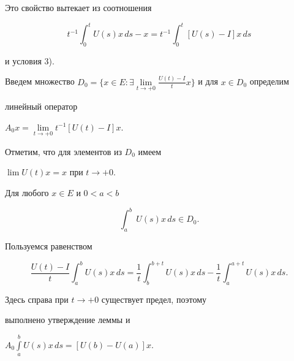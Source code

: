 Это свойство вытекает из соотношения


$$


t^{-1}\int^{t}_{0} U(s)x\,ds-x=


t^{-1}\int^{t}_{0} [U(s)-I] x\,ds


$$


и условия 3).





Введем множество $D_{0}=\{


x\in E:\exists\lim\limits_{t \to + 0}


\frac{U(t)-I}{t}x \}$ и для $x\in D_{0}$ определим


линейный оператор


$A_{0}x=\lim\limits_{t\to +0} t^{-1}[ U(t)-I] x$.





Отметим, что для элементов из $D_{0}$ имеем


$\lim U(t)x=x$ при $t\to + 0$.








\begin{lem}


Для любого $x\in E$ и $0<a< b$


$$


\int^{b}_{a} \ U(s) x\,ds \in D_{0}.


$$


\end{lem}








\begin{pf}


Пользуемся равенством


$$


\frac{U(t)-I}{t}\int^{b}_{a} U(s)x\,ds=


\frac{1}{t} \int^{b+t}_{b} U(s)x\,ds-


\frac{1}{t} \int^{a+t}_{a} U(s) x\,ds.


$$


Здесь справа при $t\to +0$ существует предел, поэтому


выполнено утверждение леммы и


$A_{0}\int\limits^{b}_{a} U(s)x\,ds=[U(b)-U(a)]x$.


\end{pf}









